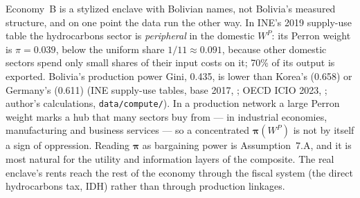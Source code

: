 \documentclass[../structural_economics_book.tex]{subfiles}
\begin{document}
Economy~B is a stylized enclave with Bolivian names, not Bolivia's measured structure, and on one point the data run the other way. In INE's 2019 supply-use table the hydrocarbons sector is \textit{peripheral} in the domestic $W^P$: its Perron weight is $\pi = 0.039$, below the uniform share $1/11 \approx 0.091$, because other domestic sectors spend only small shares of their input costs on it; 70\% of its output is exported. Bolivia's production power Gini, 0.435, is lower than Korea's (0.658) or Germany's (0.611) (INE supply-use tables, base 2017, \citealp{ine2026sut}; OECD ICIO 2023, \citealp{oecd2023icio}; author's calculations, \texttt{data/compute/}). In a production network a large Perron weight marks a hub that many sectors buy from --- in industrial economies, manufacturing and business services --- so a concentrated $\boldsymbol{\pi}(W^P)$ is not by itself a sign of oppression. Reading $\boldsymbol{\pi}$ as bargaining power is Assumption~7.A, and it is most natural for the utility and information layers of the composite. The real enclave's rents reach the rest of the economy through the fiscal system (the direct hydrocarbons tax, IDH) rather than through production linkages.
\end{document}
